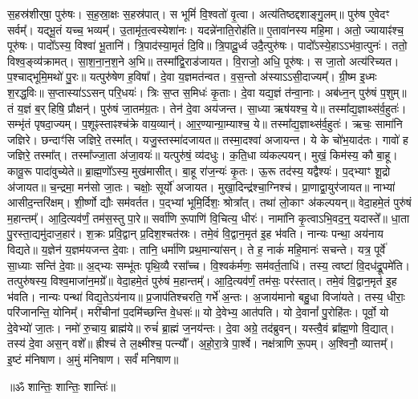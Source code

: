 

स॒हस्र॑शीर्‌षा॒ पुरु॑षः। 
स॒ह॒स्रा॒क्षः स॒हस्र॑पात्। 
स भूमिं॑ वि॒श्वतो॑ वृ॒त्वा। 
अत्य॑तिष्ठद्दशाङ्गु॒लम्॥ 
% 
पुरु॑ष ए॒वेदꣳ सर्वम्᳚। 
यद्भू॒तं यच्च॒ भव्यम्᳚। 
उ॒तामृ॑त॒त्वस्येशा॑नः। 
यदन्ने॑नाति॒रोह॑ति॥ 
% 
ए॒तावा॑नस्य महि॒मा। 
अतो॒ ज्यायाꣴ॑श्च॒ पूरु॑षः। 
पादो᳚ऽस्य॒ विश्वा॑ भू॒तानि॑। 
त्रि॒पाद॑स्या॒मृतं॑ दि॒वि॥ 
% 
त्रि॒पादू॒र्ध्व उदै॒त्पुरु॑षः। 
पादो᳚ऽस्ये॒हाऽऽभ॑वा॒त्पुनः॑। 
ततो॒ विश्व॒ङ्व्य॑क्रामत्। 
सा॒श॒ना॒न॒श॒ने अ॒भि॥ 
% 
तस्मा᳚द्वि॒राड॑जायत। 
वि॒राजो॒ अधि॒ पूरु॑षः। 
स जा॒तो अत्य॑रिच्यत। 
प॒श्चाद्भूमि॒मथो॑ पु॒रः॥ 
% 
 यत्पुरु॑षेण ह॒विषा᳚। 
दे॒वा य॒ज्ञमत॑न्वत। 
व॒स॒न्तो अ॑स्याऽऽसी॒दाज्यम्᳚। 
ग्री॒ष्म इ॒ध्मः श॒रद्ध॒विः॥ 
% 
 स॒प्तास्या॑ऽऽसन्  परि॒धयः॑। 
त्रिः स॒प्त स॒मिधः॑ कृ॒ताः। 
दे॒वा यद्य॒ज्ञं त॑न्वा॒नाः। 
अब॑ध्न॒न् पुरु॑षं प॒शुम्॥ 
% 
 तं य॒ज्ञं ब॒र्‌हिषि॒ प्रौक्षन्॑। 
पुरु॑षं जा॒तम॑ग्र॒तः। 
तेन॑ दे॒वा अय॑जन्त। 
सा॒ध्या ऋष॑यश्च॒ ये॥ 
% 
तस्मा᳚द्य॒ज्ञाथ्स॑र्व॒हुतः॑। 
सम्भृ॑तं पृषदा॒ज्यम्। 
प॒शूꣴस्ताꣴश्च॑क्रे वाय॒व्यान्॑। 
आ॒र॒ण्यान्ग्रा॒म्याश्च॒ ये॥ 
% 
 तस्मा᳚द्य॒ज्ञाथ्स॑र्व॒हुतः॑। 
ऋचः॒ सामा॑नि जज्ञिरे। 
छन्दाꣳ॑सि जज्ञिरे॒ तस्मा᳚त्। 
यजु॒स्तस्मा॑दजायत॥ 
% 
तस्मा॒दश्वा॑ अजायन्त। 
ये के चो॑भ॒याद॑तः। 
गावो॑ ह जज्ञिरे॒ तस्मा᳚त्। 
तस्मा᳚ज्जा॒ता अ॑जा॒वयः॑॥ 
% 
यत्पुरु॑षं॒ व्य॑दधुः। 
क॒ति॒धा व्य॑कल्पयन्। 
मुखं॒ किम॑स्य॒ कौ बा॒हू। 
कावू॒रू पादा॑वुच्येते॥ 
% 
ब्रा॒ह्म॒णो᳚ऽस्य॒ मुख॑मासीत्। 
बा॒हू रा॑ज॒न्यः॑ कृ॒तः। 
ऊ॒रू तद॑स्य॒ यद्वैश्यः॑। 
प॒द्भ्याꣳ शू॒द्रो अ॑जायत॥ 
% 
च॒न्द्रमा॒ मन॑सो जा॒तः। 
चक्षोः॒ सूर्यो॑ अजायत। 
मुखा॒दिन्द्र॑श्चा॒ग्निश्च॑। 
प्रा॒णाद्वा॒युर॑जायत॥ 
% 
नाभ्या॑ आसीद॒न्तरि॑क्षम्। 
शी॒र्ष्णो द्यौः सम॑वर्तत। 
प॒द्भ्यां भूमि॒र्दिशः॒ श्रोत्रा᳚त्। 
तथा॑ लो॒काꣳ अ॑कल्पयन्॥ 
% 
वेदा॒हमे॒तं पुरु॑षं म॒हान्तम्᳚। 
आ॒दि॒त्यव॑र्णं॒ तम॑स॒स्तु पा॒रे॥ 
% 
सर्वा॑णि रू॒पाणि॑ वि॒चित्य॒ धीरः॑। 
नामा॑नि कृ॒त्वाऽभि॒वद॒न्॒ यदास्ते᳚॥ 
% 
धा॒ता पु॒रस्ता॒द्यमु॑दाज॒हार॑। 
श॒क्रः प्रवि॒द्वान्  प्र॒दिश॒श्चत॑स्रः। 
तमे॒वं वि॒द्वान॒मृत॑ इ॒ह भ॑वति। 
नान्यः पन्था॒ अय॑नाय विद्यते॥ 
% 
य॒ज्ञेन॑ य॒ज्ञम॑यजन्त दे॒वाः। 
तानि॒ धर्मा॑णि प्रथ॒मान्या॑सन्। 
ते ह॒ नाकं॑ महि॒मानः॑ सचन्ते। 
यत्र॒ पूर्वे॑ सा॒ध्याः सन्ति॑ दे॒वाः॥ 
% 
अ॒द्भ्यः सम्भू॑तः पृथि॒व्यै रसा᳚च्च। 
वि॒श्वक॑र्मणः॒ सम॑वर्त॒ताधि॑। 
तस्य॒ त्वष्टा॑ वि॒दध॑द्रू॒पमे॑ति। 
तत्पुरु॑षस्य॒ विश्व॒माजा॑न॒मग्रे᳚॥ 
% 
वेदा॒हमे॒तं पुरु॑षं म॒हान्तम्᳚। 
आ॒दि॒त्यव॑र्णं॒ तम॑सः॒ पर॑स्तात्। 
तमे॒वं वि॒द्वान॒मृत॑ इ॒ह भ॑वति। 
नान्यः पन्था॑ विद्य॒तेऽय॑नाय॥ 
% 
प्र॒जाप॑तिश्चरति॒ गर्भे॑ अ॒न्तः। 
अ॒जाय॑मानो बहु॒धा विजा॑यते। 
तस्य॒ धीराः॒ परि॑जानन्ति॒ योनिम्᳚। 
मरी॑चीनां प॒दमि॑च्छन्ति वे॒धसः॑॥ 
% 
यो दे॒वेभ्य॒ आत॑पति। 
यो दे॒वानां᳚ पु॒रोहि॑तः। 
पूर्वो॒ यो दे॒वेभ्यो॑ जा॒तः। 
नमो॑ रु॒चाय॒ ब्राह्म॑ये॥ 
% 
रुचं॑ ब्रा॒ह्मं ज॒नय॑न्तः। 
दे॒वा अग्रे॒ तद॑ब्रुवन्। 
यस्त्वै॒वं ब्रा᳚ह्म॒णो वि॒द्यात्। 
तस्य॑ दे॒वा अस॒न् वशे᳚॥ 
% 
ह्रीश्च॑ ते ल॒क्ष्मीश्च॒ पत्न्यौ᳚। 
अ॒हो॒रा॒त्रे पा॒र्श्वे। 
नक्ष॑त्राणि रू॒पम्। 
अ॒श्विनौ॒ व्यात्तम्᳚। 
इ॒ष्टं म॑निषाण। 
अ॒मुं म॑निषाण। 
सर्वं॑ मनिषाण॥ 
% 


\centerline{॥ॐ शान्तिः॒ शान्तिः॒ शान्तिः॑॥}